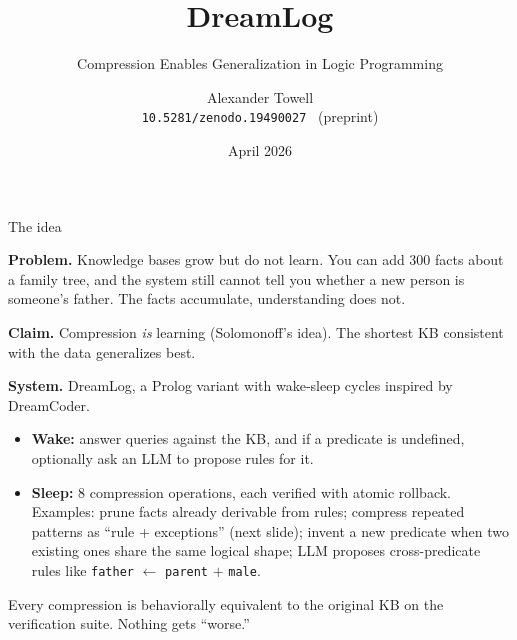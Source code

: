 \documentclass[10pt,aspectratio=169]{beamer}
\title{DreamLog}
\subtitle{Compression Enables Generalization in Logic Programming}
\author[A. Towell]{Alexander Towell \\[0.3em]
  \small\texttt{10.5281/zenodo.19490027} \ (preprint)}
\institute[SIUE]{Southern Illinois University Edwardsville}
\date{April 2026}
\begin{document}
\begin{frame}
  \titlepage
\end{frame}

\begin{frame}{The idea}

  \textbf{Problem.} Knowledge bases grow but do not learn. You can add
  300 facts about a family tree, and the system still cannot tell you
  whether a new person is someone's father. The facts accumulate,
  understanding does not.

  \vspace{0.8em}

  \textbf{Claim.} Compression \emph{is} learning (Solomonoff's idea).
  The shortest KB consistent with the data generalizes best.

  \vspace{0.8em}

  \textbf{System.} DreamLog, a Prolog variant with wake-sleep cycles
  inspired by DreamCoder.

  \begin{itemize}
    \item \textbf{Wake:} answer queries against the KB, and if a
          predicate is undefined, optionally ask an LLM to propose
          rules for it.
    \item \textbf{Sleep:} 8 compression operations, each verified
          with atomic rollback. Examples: prune facts already
          derivable from rules; compress repeated patterns as
          ``rule + exceptions'' (next slide); invent a new
          predicate when two existing ones share the same logical
          shape; LLM proposes cross-predicate rules like
          \texttt{father} $\leftarrow$ \texttt{parent} $+$
          \texttt{male}.
  \end{itemize}

  Every compression is behaviorally equivalent to the original KB on
  the verification suite. Nothing gets ``worse.''
\end{frame}
\end{document}
